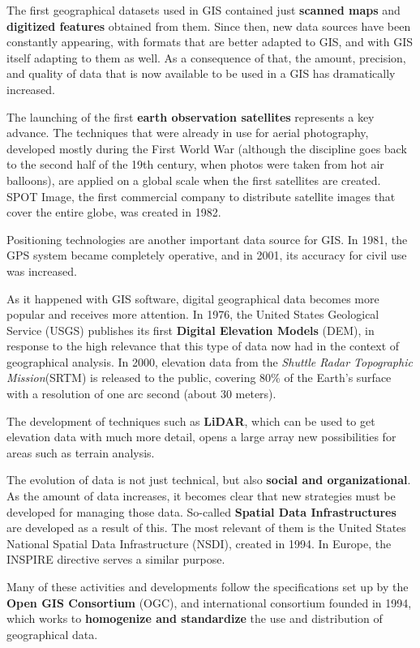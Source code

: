 The first geographical datasets used in GIS contained just \textbf{scanned maps} and \textbf{digitized features} obtained from them. Since then, new data sources have been constantly appearing, with formats that are better adapted to GIS, and with GIS itself adapting to them as well. As a consequence of that, the amount, precision, and quality of data that is now available to be used in a GIS has dramatically increased.

The launching of the first \textbf{earth observation satellites} represents a key advance. The techniques that were already in use for aerial photography, developed mostly during the First World War (although the discipline goes back to the second half of the 19th century, when photos were taken from hot air balloons), are applied on a global scale when the first satellites are created. SPOT Image, the first commercial company to distribute satellite images that cover the entire globe, was created in 1982.

Positioning technologies are another important data source for GIS. In 1981, the GPS system became completely operative, and in 2001, its accuracy for civil use was increased.

As it happened with GIS software, digital geographical data becomes more popular and receives more attention. In 1976, the United States Geological Service (USGS) publishes its first \textbf{Digital Elevation Models} (DEM), in response to the high relevance that this type of data now had in the context of geographical analysis. In 2000, elevation data from the \emph{Shuttle Radar Topographic Mission}(SRTM) is released to the public, covering 80\% of the Earth's surface with a resolution of one arc second (about 30 meters).

The development of techniques such as \textbf{LiDAR}, which can be used to get elevation data with much more detail, opens a large array new possibilities for areas such as terrain analysis.

The evolution of data is not just technical, but also \textbf{social and organizational}. As the amount of data increases, it becomes clear that new strategies must be developed for managing those data. So-called \textbf{Spatial Data Infrastructures} are developed as a result of this. The most relevant of them is the United States National Spatial Data Infrastructure (NSDI), created in 1994. In Europe, the INSPIRE directive serves a similar purpose.

Many of these activities and developments follow the specifications set up by the \textbf{Open GIS Consortium} (OGC), and international consortium founded in 1994, which works to \textbf{homogenize and standardize} the use and distribution of geographical data.

